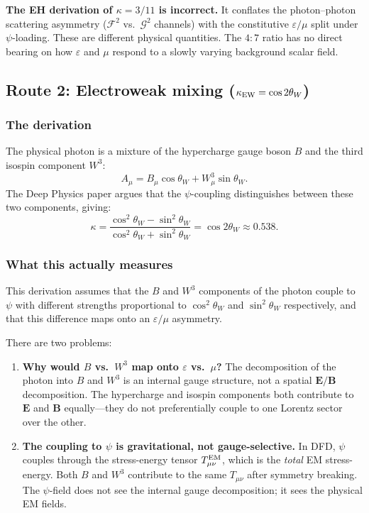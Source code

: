 \documentclass[11pt,a4paper]{article}
\newcommand{\vE}{\mathbf{E}}
\newcommand{\vB}{\mathbf{B}}
\begin{document}
\begin{tcolorbox}[colback=red!5!white, colframe=red!60!black,
title=Verdict on EH Route]
\textbf{The EH derivation of $\kappa = 3/11$ is incorrect.}  It conflates
the photon--photon scattering asymmetry ($\mathcal{F}^2$ vs.\
$\mathcal{G}^2$ channels) with the constitutive $\varepsilon/\mu$ split
under $\psi$-loading.  These are different physical quantities.  The
$4:7$ ratio has no direct bearing on how $\varepsilon$ and $\mu$
respond to a slowly varying background scalar field.
\end{tcolorbox}

\subsection{Route 2: Electroweak mixing ($\kappa_{\rm EW} = \cos 2\theta_W$)}

\subsubsection{The derivation}

The physical photon is a mixture of the hypercharge gauge boson $B$ and
the third isospin component $W^3$:
\begin{equation}
A_\mu = B_\mu \cos\theta_W + W^3_\mu \sin\theta_W.
\end{equation}
The Deep Physics paper argues that the $\psi$-coupling distinguishes
between these two components, giving:
\begin{equation}
\kappa = \frac{\cos^2\theta_W - \sin^2\theta_W}
{\cos^2\theta_W + \sin^2\theta_W} = \cos 2\theta_W \approx 0.538.
\end{equation}

\subsubsection{What this actually measures}

This derivation assumes that the $B$ and $W^3$ components of the photon
couple to $\psi$ with different strengths proportional to $\cos^2\theta_W$
and $\sin^2\theta_W$ respectively, and that this difference maps onto an
$\varepsilon/\mu$ asymmetry.

There are two problems:
\begin{enumerate}
\item \textbf{Why would $B$ vs.\ $W^3$ map onto $\varepsilon$ vs.\ $\mu$?}
  The decomposition of the photon into $B$ and $W^3$ is an internal gauge
  structure, not a spatial $\vE/\vB$ decomposition.  The hypercharge and
  isospin components both contribute to $\vE$ and $\vB$ equally---they do
  not preferentially couple to one Lorentz sector over the other.

\item \textbf{The coupling to $\psi$ is gravitational, not gauge-selective.}
  In DFD, $\psi$ couples through the stress-energy tensor
  $T_{\mu\nu}^{\rm EM}$, which is the \emph{total} EM stress-energy.
  Both $B$ and $W^3$ contribute to the same $T_{\mu\nu}$ after symmetry
  breaking.  The $\psi$-field does not see the internal gauge decomposition;
  it sees the physical EM fields.
\end{enumerate}
\end{document}
